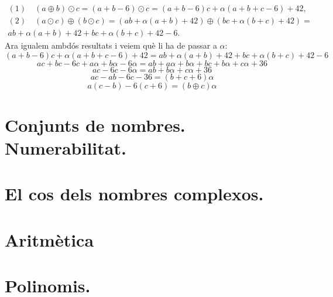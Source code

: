 \documentclass[11pt]{article}
\begin{document}
\begin{legal}
\begin{legal}
		\[
		\begin{array}{lcl}
			(1)\quad (a\oplus b)\odot c=(a+b-6)\odot c=(a+b-6)c+\alpha(a+b+c-6)+42,\\
			(2)\quad (a\odot c)\oplus(b\odot c)=(ab+\alpha(a+b)+42)\oplus(bc+\alpha(b+c)+42)=\\
			ab+\alpha(a+b)+42+bc+\alpha(b+c)+42-6.
		\end{array}
		\]
		Ara igualem ambdós resultats i veiem què li ha de passar a $\alpha$:
		$$(a+b-6)c+\alpha(a+b+c-6)+42=ab+\alpha(a+b)+42+bc+\alpha(b+c)+42-6$$
		$$ac+bc-6c+a\alpha+b\alpha-6\alpha=ab+a\alpha+b\alpha+bc+b\alpha+c\alpha+36$$
		$$ac-6c-6\alpha=ab+b\alpha+c\alpha+36$$
		$$ac-ab-6c-36=(b+c+6)\alpha$$
		$$a(c-b)-6(c+6)=(b\oplus c)\alpha$$
	\end{legal}
\end{legal}

\newpage

\section{Conjunts de nombres. Numerabilitat.}

\newpage

\section{El cos dels nombres complexos.}

\newpage

\section{Aritmètica}

\newpage

\section{Polinomis.}
\end{document}
